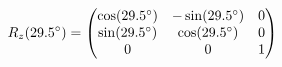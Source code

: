 \documentclass[preview]{standalone}
\begin{document}
\begin{align*}
\special{dvisvgm:raw <g id='unique000'>}R_z(29.5^\circ) = \begin{pmatrix} \cos(29.5^\circ) & -\sin(29.5^\circ) & 0 \\ \sin(29.5^\circ) & \cos(29.5^\circ) & 0 \\ 0 & 0 & 1 \end{pmatrix}\special{dvisvgm:raw </g>}
\end{align*}
\end{document}
